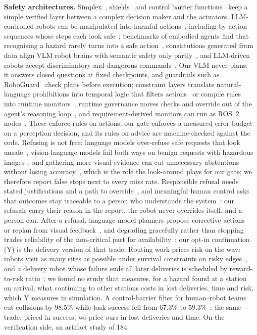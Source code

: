 \documentclass[conference]{IEEEtran}
\begin{document}
\textbf{Safety architectures.} Simplex~\cite{seto1998simplex,sha2001simplicity}, shields~\cite{alshiekh2018shielding}
and control barrier functions~\cite{ames2019cbf} keep a simple verified layer between a complex decision maker and
the actuators. LLM-controlled robots can be manipulated into harmful actions~\cite{robey2025jailbreaking}, including by action sequences whose steps each look safe~\cite{huang2026blindfold}; benchmarks of embodied agents find that recognising a hazard rarely turns into a safe action~\cite{ying2025agentsafe}, constitutions generated from data align VLM robot brains with semantic safety only partly~\cite{sermanet2025asimov}, and LLM-driven robots accept discriminatory and dangerous commands~\cite{hundt2024llmrobots}. Our VLM never plans: it answers closed questions at fixed checkpoints, and
guardrails such as RoboGuard~\cite{ravichandran2026guardrails} check plans before execution; constraint layers translate natural-language prohibitions into temporal logic that filters actions~\cite{yang2024safetychip} or compile rules into runtime monitors~\cite{yang2026labguard}, runtime governance moves checks and override out of the agent's reasoning loop~\cite{qin2026governance}, and requirement-derived monitors can run as ROS~2 nodes~\cite{perez2022monitoringros2}. These enforce rules on actions; our gate enforces a measured error budget on a perception decision, and its rules on advice are machine-checked against the code. Refusing is not free: language models over-refuse safe requests that look unsafe~\cite{rottger2024xstest}, vision-language models fail both ways on benign requests with hazardous images~\cite{ren2025dualbench}, and gathering more visual evidence can cut unnecessary abstentions without losing accuracy~\cite{srinivasan2024recoverr}, which is the role the look-around plays for our gate; we therefore report false stops next to every miss rate. Responsible refusal needs stated justifications and a path to override~\cite{slavkovik2026noncompliant}, and meaningful human control asks that outcomes stay traceable to a person who understands the system~\cite{santonidesio2018mhc,calvert2025mhc}: our refusals carry their reason in the report, the robot never overrides itself, and a person can. After a refusal, language-model planners propose corrective actions~\cite{raman2022cape} or replan from visual feedback~\cite{mei2024replanvlm}, and degrading gracefully rather than stopping trades reliability of the non-critical part for availability~\cite{weiss2023graceful}; our opt-in continuation (Y) is the delivery version of that trade. Routing work prices risk on the way: robots visit as many sites as possible under survival constraints on risky edges~\cite{jorgensen2016tsop}, and a delivery robot whose failure ends all later deliveries is scheduled by reward-to-risk ratio~\cite{wilson2021riskydeliveries}; we found no study that measures, for a hazard found at a station on arrival, what continuing to other stations costs in lost deliveries, time and risk, which Y measures in simulation. A control-barrier filter for human--robot teams cut collisions by 98.5\% while task success fell from 67.3\% to 59.3\%~\cite{li2026sage}: the same trade, priced in success; we price ours in lost deliveries and time. On the verification side, an artifact study of 184 
\end{document}
